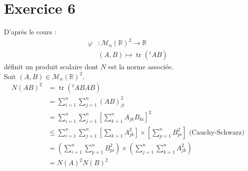 \documentclass[../main.tex]{subfiles}
\begin{document}
\section*{Exercice 6}
\noindent D'après le cours : 
\begin{align*}
    \varphi&:\mathcal{M}_n(\mathbb{R})^2\to \mathbb{R} \\
    &(A, B)\mapsto \operatorname{tr}({^tAB})
\end{align*}
définit un produit scalaire dont $N$ est la norme associée. \\
Soit $(A, B)\in \mathcal{M}_n(\mathbb{R})^2$. 
\begin{align*}
    N(AB)^2 &= \operatorname{tr}({^tAB}AB) \\
    &= \sum_{i=1}^{n} \sum_{j=1}^{n} (AB)_{ji}^2 \\
    &= \sum_{i=1}^{n} \sum_{j=1}^{n} \left[ \sum_{k=1}^{n} A_{jk} B_{ki} \right]^2 \\
    &\leq \sum_{i=1}^{n} \sum_{j=1}^{n} \left[ \sum_{k=1}^{} A_{jk}^2 \right]\times \left[ \sum_{p=1}^{n} B_{pi}^2 \right] \text{ (Cauchy-Schwarz)} \\
    &= \left( \sum_{i=1}^{n} \sum_{p=1}^{n} B_{pi}^2 \right) \times \left( \sum_{j=1}^{n} \sum_{k=1}^{n} A_{jk}^2 \right) \\
    &= N(A)^2N(B)^2
\end{align*}
\end{document}
